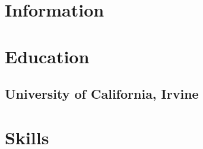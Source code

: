 \begin{aside}

  \section{Information}
  \vspace{3.5mm}
  \makesideheader

  \section{Education}
    \vspace{-0.5mm}
    \subsection{University of California, Irvine}
    \begin{flushleft}
    \end{flushleft}
    \vspace{2mm}
    \begin{flushright}
    \end{flushright}

  \section{Skills}
    \vspace{-0.5mm}


\end{aside}
